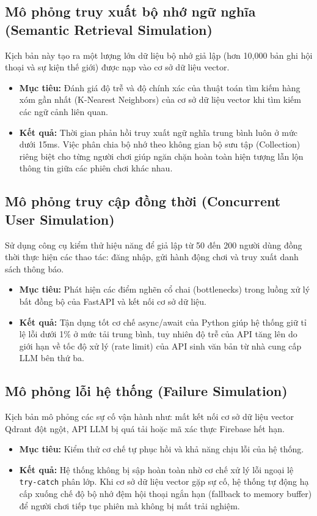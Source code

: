 \documentclass[a4paper]{article}
\begin{document}
\begin{titlepage}
\subsection{Mô phỏng truy xuất bộ nhớ ngữ nghĩa (Semantic Retrieval Simulation)}
Kịch bản này tạo ra một lượng lớn dữ liệu bộ nhớ giả lập (hơn 10,000 bản ghi hội thoại và sự kiện thế giới) được nạp vào cơ sở dữ liệu vector.
\begin{itemize}
    \item \textbf{Mục tiêu:} Đánh giá độ trễ và độ chính xác của thuật toán tìm kiếm hàng xóm gần nhất (K-Nearest Neighbors) của cơ sở dữ liệu vector khi tìm kiếm các ngữ cảnh liên quan.
    \item \textbf{Kết quả:} Thời gian phản hồi truy xuất ngữ nghĩa trung bình luôn ở mức dưới 15ms. Việc phân chia bộ nhớ theo không gian bộ sưu tập (Collection) riêng biệt cho từng người chơi giúp ngăn chặn hoàn toàn hiện tượng lẫn lộn thông tin giữa các phiên chơi khác nhau.
\end{itemize}

\subsection{Mô phỏng truy cập đồng thời (Concurrent User Simulation)}
Sử dụng công cụ kiểm thử hiệu năng để giả lập từ 50 đến 200 người dùng đồng thời thực hiện các thao tác: đăng nhập, gửi hành động chơi và truy xuất danh sách thông báo.
\begin{itemize}
    \item \textbf{Mục tiêu:} Phát hiện các điểm nghẽn cổ chai (bottlenecks) trong luồng xử lý bất đồng bộ của FastAPI và kết nối cơ sở dữ liệu.
    \item \textbf{Kết quả:} Tận dụng tốt cơ chế async/await của Python giúp hệ thống giữ tỉ lệ lỗi dưới 1\% ở mức tải trung bình, tuy nhiên độ trễ của API tăng lên do giới hạn về tốc độ xử lý (rate limit) của API sinh văn bản từ nhà cung cấp LLM bên thứ ba.
\end{itemize}

\subsection{Mô phỏng lỗi hệ thống (Failure Simulation)}
Kịch bản mô phỏng các sự cố vận hành như: mất kết nối cơ sở dữ liệu vector Qdrant đột ngột, API LLM bị quá tải hoặc mã xác thực Firebase hết hạn.
\begin{itemize}
    \item \textbf{Mục tiêu:} Kiểm thử cơ chế tự phục hồi và khả năng chịu lỗi của hệ thống.
    \item \textbf{Kết quả:} Hệ thống không bị sập hoàn toàn nhờ cơ chế xử lý lỗi ngoại lệ \texttt{try-catch} phân lớp. Khi cơ sở dữ liệu vector gặp sự cố, hệ thống tự động hạ cấp xuống chế độ bộ nhớ đệm hội thoại ngắn hạn (fallback to memory buffer) để người chơi tiếp tục phiên mà không bị mất trải nghiệm.
\end{itemize}


\end{titlepage}
\end{document}

